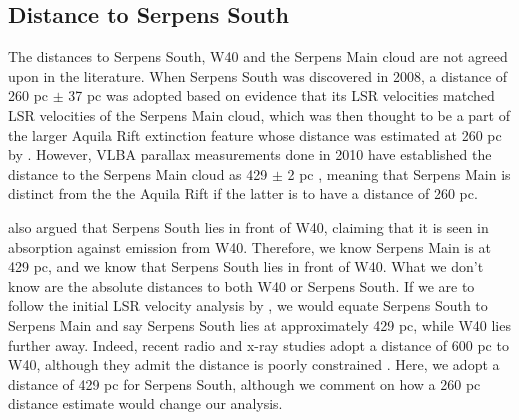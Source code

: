 \documentclass[apj]{emulateapj}
\begin{document}



\subsection{Distance to Serpens South}
\label{subsec:distance to serpens south}

The distances to Serpens South, W40 and the Serpens Main cloud are not agreed upon in the literature. When Serpens South was discovered in 2008, a distance of 260 pc $\pm$ 37 pc was adopted based on evidence that its LSR velocities matched LSR velocities of the Serpens Main cloud, which was then thought to be a part of the larger Aquila Rift extinction feature whose distance was estimated at 260 pc by \citet{Straizys03}. However, VLBA parallax measurements done in 2010 have established the distance to the Serpens Main cloud as 429 $\pm$ 2 pc \citep{Dzib11}, meaning that Serpens Main is distinct from the the Aquila Rift if the latter is to have a distance of 260 pc. 

\citet{Gutermuth08} also argued that Serpens South lies in front of W40, claiming that it is seen in absorption against emission from W40. Therefore, we know Serpens Main is at 429 pc, and we know that Serpens South lies in front of W40. What we don't know are the absolute distances to both W40 or Serpens South. If we are to follow the initial LSR velocity analysis by \citet{Gutermuth08}, we would equate Serpens South to Serpens Main and say Serpens South lies at approximately 429 pc, while W40 lies further away. Indeed, recent radio and x-ray studies adopt a distance of 600 pc to W40, although they admit the distance is poorly constrained \citep{Kuhn10, Rodriguez10}. Here, we adopt a distance of 429 pc for Serpens South, although we comment on how a 260 pc distance estimate would change our analysis.
\end{document}
